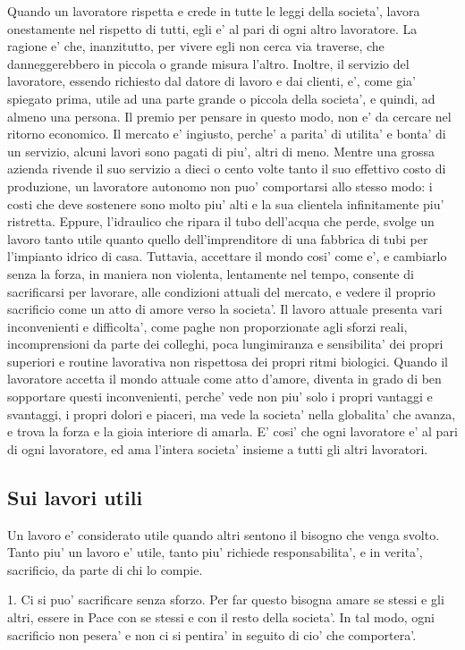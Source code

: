 Quando un lavoratore rispetta e crede in tutte le leggi della societa', lavora onestamente nel rispetto di tutti, egli e' al pari di ogni altro lavoratore. La ragione e' che, inanzitutto, per vivere egli non cerca via traverse, che danneggerebbero in piccola o grande misura l'altro. Inoltre, il servizio del lavoratore, essendo richiesto dal datore di lavoro e dai clienti, e', come gia' spiegato prima, utile ad una parte grande o piccola della societa', e quindi, ad almeno una persona.
  Il premio per pensare in questo modo, non e' da cercare nel ritorno economico. Il mercato e' ingiusto, perche' a parita' di utilita' e bonta' di un servizio, alcuni lavori sono pagati di piu', altri di meno. Mentre una grossa azienda rivende il suo servizio a dieci o cento volte tanto il suo effettivo costo di produzione, un lavoratore autonomo non puo' comportarsi allo stesso modo: i costi che deve sostenere sono molto piu' alti e la sua clientela infinitamente piu' ristretta. Eppure, l'idraulico che ripara il tubo dell'acqua che perde, svolge un lavoro tanto utile quanto quello dell'imprenditore di una fabbrica di tubi per l'impianto idrico di casa.
Tuttavia, accettare il mondo cosi' come e', e cambiarlo senza la forza, in maniera non violenta, lentamente nel tempo, consente di sacrificarsi per lavorare, alle condizioni attuali del mercato, e vedere il proprio sacrificio come un atto di amore verso la societa'. Il lavoro attuale presenta vari inconvenienti e difficolta', come paghe non proporzionate agli sforzi reali, incomprensioni da parte dei colleghi, poca lungimiranza e sensibilita' dei propri superiori e routine lavorativa non rispettosa dei propri ritmi biologici. Quando il lavoratore accetta il mondo attuale come atto d'amore, diventa in grado di ben sopportare questi inconvenienti, perche' vede non piu' solo i propri vantaggi e svantaggi, i propri dolori e piaceri, ma vede la societa' nella globalita' che avanza, e trova la forza e la gioia interiore di amarla. 
E' cosi' che ogni lavoratore e' al pari di ogni lavoratore, ed ama l'intera societa' insieme a tutti gli altri lavoratori.

\subsection{Sui lavori utili}
Un lavoro e' considerato utile quando altri sentono il bisogno che venga svolto. Tanto piu' un lavoro e' utile, tanto piu' richiede responsabilita', e in verita', sacrificio, da parte di chi lo compie. 

1. Ci si puo' sacrificare senza sforzo. Per far questo bisogna amare se stessi e gli altri, essere in Pace con se stessi e con il resto della societa'. In tal modo, ogni sacrificio non pesera' e non ci si pentira' in seguito di cio' che comportera'.

